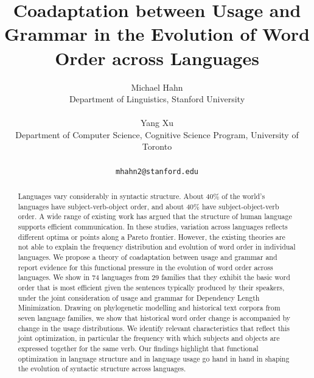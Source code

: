 \documentclass[11pt,a4paper]{article}
\title{Coadaptation between
Usage and Grammar in the Evolution of Word Order across Languages}
\author{Michael Hahn\\Department of Linguistics, Stanford University\\\\Yang Xu\\ Department of Computer Science, Cognitive Science Program, University of Toronto\\\\ \texttt{mhahn2@stanford.edu}}
\date{}
\begin{document}
\maketitle

\linenumbers

\begin{abstract}
Languages vary considerably in syntactic structure.
About 40\% of the world's languages have subject-verb-object order, and about 40\% have subject-object-verb order.
A wide range of existing work has argued that the structure of human language supports efficient communication. In these studies, variation across languages reflects different optima or points along a Pareto frontier. However, the existing theories are not able to explain the  frequency distribution and evolution of word order in individual languages.
We propose a theory of coadaptation between usage and grammar and report evidence for this functional pressure in the evolution of word order across languages. We show in 74 languages from 29 families that they exhibit the basic word order that is most efficient given the sentences typically produced by their speakers, under the joint consideration of usage and grammar for Dependency Length Minimization.
Drawing on phylogenetic modelling and historical text corpora from seven language families, we show that historical word order change is accompanied by change in the usage distributions.
We identify relevant characteristics that reflect this joint optimization, in particular the frequency with which subjects and objects are expressed together for the same verb.
Our findings highlight that functional optimization in language structure and in language usage go hand in hand in shaping the evolution of syntactic structure across languages.
\end{abstract}



\end{document}
